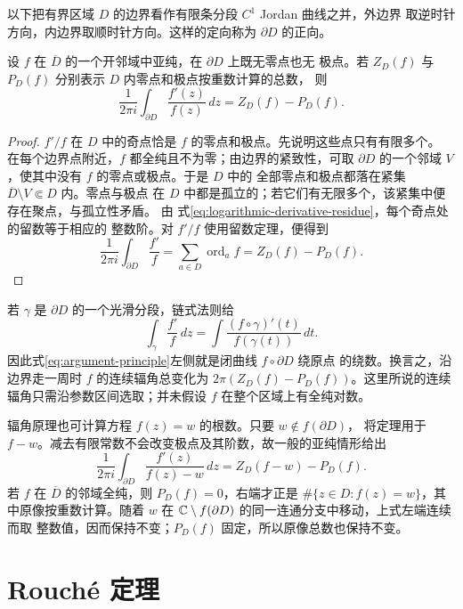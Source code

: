以下把有界区域 $D$ 的边界看作有限条分段 $C^1$ Jordan 曲线之并，外边界
取逆时针方向，内边界取顺时针方向。这样的定向称为 $\partial D$ 的正向。

\begin{theorem}[辐角原理]\label{thm:argument-principle}
设 $f$ 在 $\overline D$ 的一个开邻域中亚纯，在 $\partial D$ 上既无零点也无
极点。若 $Z_D(f)$ 与 $P_D(f)$ 分别表示 $D$ 内零点和极点按重数计算的总数，
则
\begin{equation}\label{eq:argument-principle}
 \frac{1}{2\pi i}\int_{\partial D}\frac{f'(z)}{f(z)}\,dz
 =Z_D(f)-P_D(f).
\end{equation}
\end{theorem}

\begin{proof}
$f'/f$ 在 $D$ 中的奇点恰是 $f$ 的零点和极点。先说明这些点只有有限多个。
在每个边界点附近，$f$ 都全纯且不为零；由边界的紧致性，可取
$\partial D$ 的一个邻域 $V$，使其中没有 $f$ 的零点或极点。于是 $D$ 中的
全部零点和极点都落在紧集 $\overline D\setminus V\Subset D$ 内。零点与极点
在 $D$ 中都是孤立的；若它们有无限多个，该紧集中便存在聚点，与孤立性矛盾。
由
式\eqref{eq:logarithmic-derivative-residue}，每个奇点处的留数等于相应的
整数阶。对 $f'/f$ 使用留数定理，便得到
\[
 \frac{1}{2\pi i}\int_{\partial D}\frac{f'}f
 =\sum_{a\in D}\operatorname{ord}_a f
 =Z_D(f)-P_D(f).
\]
\end{proof}

若 $\gamma$ 是 $\partial D$ 的一个光滑分段，链式法则给
\[
 \int_\gamma\frac{f'}f\,dz
 =\int\frac{(f\circ\gamma)'(t)}{f(\gamma(t))}\,dt.
\]
因此式\eqref{eq:argument-principle}左侧就是闭曲线 $f\circ\partial D$ 绕原点
的绕数。换言之，沿边界走一周时 $f$ 的连续辐角总变化为
$2\pi(Z_D(f)-P_D(f))$。这里所说的连续辐角只需沿参数区间选取；并未假设
$f$ 在整个区域上有全纯对数。

辐角原理也可计算方程 $f(z)=w$ 的根数。只要 $w\notin f(\partial D)$，
将定理用于 $f-w$。减去有限常数不会改变极点及其阶数，故一般的亚纯情形给出
\[
 \frac{1}{2\pi i}\int_{\partial D}
 \frac{f'(z)}{f(z)-w}\,dz
 =Z_D(f-w)-P_D(f).
\]
若 $f$ 在 $\overline D$ 的邻域全纯，则 $P_D(f)=0$，右端才正是
$\#\{z\in D:f(z)=w\}$，其中原像按重数计算。随着 $w$ 在
$\mathbb{C}\setminus f(\partial D)$ 的同一连通分支中移动，上式左端连续而取
整数值，因而保持不变；$P_D(f)$ 固定，所以原像总数也保持不变。

\section{Rouché 定理}

